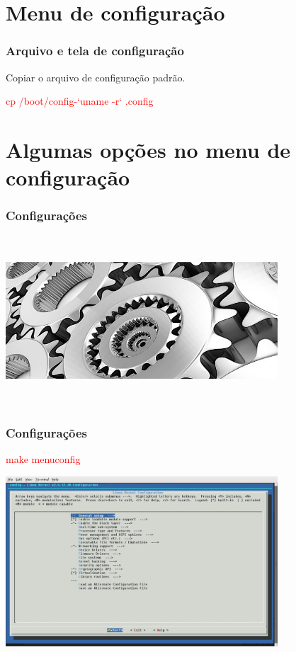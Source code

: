\documentclass{beamer}
\begin{document}
\section{Menu de configuração}

\begin{frame}
 \frametitle{Arquivo e tela de configuração}
 Copiar o arquivo de configuração padrão. \\
 \begin{center}
  \textcolor{red}{cp /boot/config-`uname -r` .config} \\
 \end{center}
\end{frame}

\section{Algumas opções no menu de configuração}

\begin{frame}
  \frametitle{Configurações}
  \begin{center}
    \includegraphics[height = 2.5in, width = 4in]{images/configuration.jpg}
  \end{center}
\end{frame}

\begin{frame}
  \frametitle{Configurações}
  \begin{center}
    \textcolor{red}{make menuconfig} \\
  \end{center}
  \includegraphics[height = 2.5in, width = 4in]{images/PrimeiraTela.png}
\end{frame}
\end{document}

